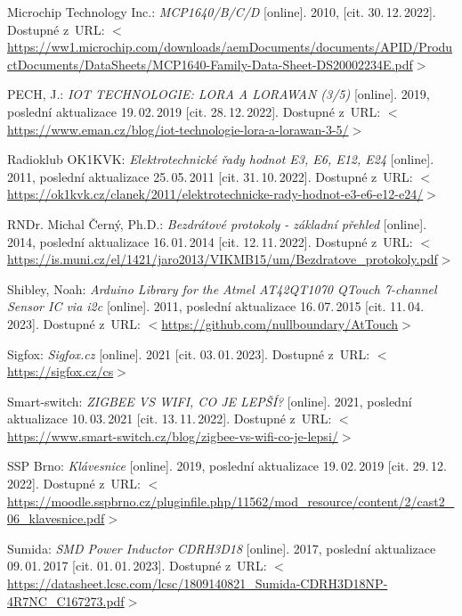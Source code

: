 \begin{thebibliography}{99}
    Microchip Technology Inc.:
    \emph{MCP1640/B/C/D}\/ [online].
    2010, [cit. 30.\,12.\,2022].
    Dostupné z~URL: 
    \(<\)\url{https://ww1.microchip.com/downloads/aemDocuments/documents/APID/ProductDocuments/DataSheets/MCP1640-Family-Data-Sheet-DS20002234E.pdf}\(>\)

    PECH, J.:
    \emph{IOT TECHNOLOGIE: LORA A LORAWAN (3/5)}\/ [online].
    2019, poslední aktualizace 19.\,02.\,2019 [cit. 28.\,12.\,2022].
    Dostupné z~URL:
    \(<\)\url{https://www.eman.cz/blog/iot-technologie-lora-a-lorawan-3-5/}\(>\)

    Radioklub OK1KVK:
    \emph{Elektrotechnické řady hodnot E3, E6, E12, E24}\/ [online].
    2011, poslední aktualizace 25.\,05.\,2011 [cit. 31.\,10.\,2022].
    Dostupné z~URL: 
    \(<\)\url{https://ok1kvk.cz/clanek/2011/elektrotechnicke-rady-hodnot-e3-e6-e12-e24/}\(>\)

    RNDr. Michal Černý, Ph.D.:
    \emph{Bezdrátové protokoly - základní přehled}\/ [online].
    2014, poslední aktualizace 16.\,01.\,2014 [cit. 12.\,11.\,2022].
    Dostupné z~URL: 
    \(<\)\url{https://is.muni.cz/el/1421/jaro2013/VIKMB15/um/Bezdratove_protokoly.pdf}\(>\)

    Shibley, Noah:
    \emph{Arduino Library for the Atmel AT42QT1070 QTouch 7-channel Sensor IC via i2c}\/ [online].
    2011, poslední aktualizace 16.\,07.\,2015 [cit. 11.\,04.\,2023].
    Dostupné z~URL: 
    \(<\)\url{https://github.com/nullboundary/AtTouch}\(>\)

    Sigfox:
    \emph{Sigfox.cz}\/ [online].
    2021 [cit. 03.\,01.\,2023].
    Dostupné z~URL: 
    \(<\)\url{https://sigfox.cz/cs}\(>\)

    Smart-switch:
    \emph{ZIGBEE VS WIFI, CO JE LEPŠÍ?}\/ [online].
    2021, poslední aktualizace 10.\,03.\,2021 [cit. 13.\,11.\,2022].
    Dostupné z~URL: 
    \(<\)\url{https://www.smart-switch.cz/blog/zigbee-vs-wifi-co-je-lepsi/}\(>\)

    SSP Brno:
    \emph{Klávesnice}\/ [online].
    2019, poslední aktualizace 19.\,02.\,2019 [cit. 29.\,12.\,2022]. %
    Dostupné z~URL:
    \(<\)\url{https://moodle.sspbrno.cz/pluginfile.php/11562/mod_resource/content/2/cast2_06_klavesnice.pdf}\(>\)

    Sumida:
    \emph{SMD Power Inductor CDRH3D18}\/ [online].
    2017, poslední aktualizace 09.\,01.\,2017 [cit. 01.\,01.\,2023]. 
    Dostupné z~URL:
    \(<\)\url{https://datasheet.lcsc.com/lcsc/1809140821_Sumida-CDRH3D18NP-4R7NC_C167273.pdf}\(>\)


\end{thebibliography}
